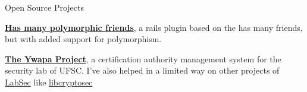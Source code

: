 \begin{rubric}{Open Source Projects} 

\entry* 
    \textbf{\href{http://code.google.com/p/has-many-polymorphic-friends}{Has
    many polymorphic friends}}, a rails plugin based on the has
    many friends, but with added support for polymorphism.

\entry* 
    \textbf{\href{https://projetos.labsec.ufsc.br/}{The Ywapa Project}}, a
    certification authority management system for the security lab of UFSC. I've
    also helped in a limited way on other projects of
    \href{https://labsec.ufsc.br/}{LabSec}
    like \href{http://projetos.labsec.ufsc.br/libcryptosec}{libcryptosec}

\end{rubric}
